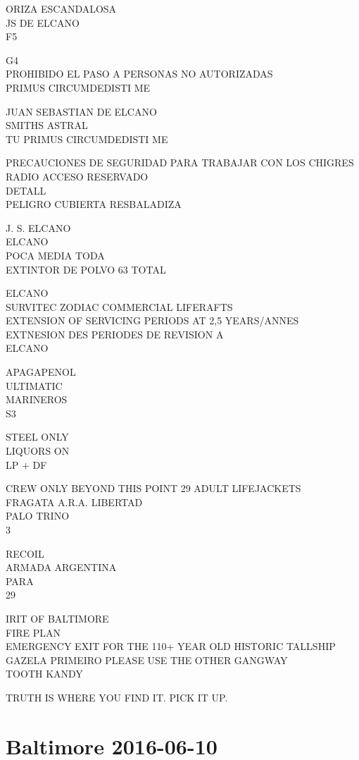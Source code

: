 \documentclass[10pt,letterpaper]{article}
\begin{document}
ORIZA ESCANDALOSA\\
JS DE ELCANO\\
F5

G4\\
PROHIBIDO EL PASO A PERSONAS NO AUTORIZADAS\\
PRIMUS CIRCUMDEDISTI ME

JUAN SEBASTIAN DE ELCANO\\
SMITHS ASTRAL\\
TU PRIMUS CIRCUMDEDISTI ME

PRECAUCIONES DE SEGURIDAD PARA TRABAJAR CON LOS CHIGRES\\
RADIO ACCESO RESERVADO\\
DETALL\\
PELIGRO CUBIERTA RESBALADIZA

J. S. ELCANO\\
ELCANO\\
POCA MEDIA TODA\\
EXTINTOR DE POLVO 63 TOTAL

ELCANO\\
SURVITEC ZODIAC COMMERCIAL LIFERAFTS\\
EXTENSION OF SERVICING PERIODS AT 2,5 YEARS/ANNES EXTNESION DES PERIODES DE REVISION A\\
ELCANO

APAGAPENOL\\
ULTIMATIC\\
MARINEROS\\
S3

STEEL ONLY\\
LIQUORS ON\\
LP + DF

CREW ONLY BEYOND THIS POINT 29 ADULT LIFEJACKETS\\
FRAGATA A.R.A. LIBERTAD\\
PALO TRINO\\
3

RECOIL\\
ARMADA ARGENTINA\\
PARA\\
29

IRIT OF BALTIMORE\\
FIRE PLAN\\
EMERGENCY EXIT FOR THE 110+ YEAR OLD HISTORIC TALLSHIP GAZELA PRIMEIRO PLEASE USE THE OTHER GANGWAY\\
TOOTH KANDY

TRUTH IS WHERE YOU FIND IT.  PICK IT UP.
\pagebreak

\section*{Baltimore 2016-06-10}
\end{document}
